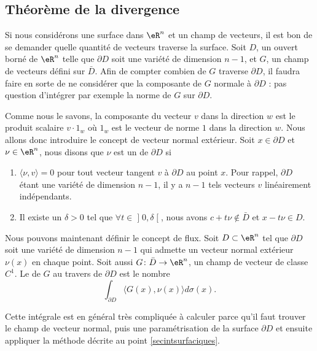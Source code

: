 \subsection{Théorème de la divergence}

Si nous considérons une surface dans $\eR^n$ et un champ de vecteurs, il est bon de se demander quelle \og quantité de vecteurs\fg{} traverse la surface. Soit $D$, un ouvert borné de $\eR^n$ telle que $\partial D$ soit une variété de dimension $n-1$, et $G$, un champ de vecteurs défini sur $\bar D$. Afin de compter combien de $G$ traverse $\partial D$, il faudra faire en sorte de ne considérer que la composante de $G$ normale à $\partial D$ : pas question d'intégrer par exemple la norme de $G$ sur $\partial D$.

Comme nous le savons, la composante du vecteur $v$ dans la direction $w$ est le produit scalaire $v\cdot 1_w$ où $1_w$ est le vecteur de norme $1$ dans la direction $w$. Nous allons donc introduire le concept de vecteur normal extérieur. Soit $x\in\partial D$ et $\nu\in\eR^n$, nous disons que $\nu$ est un  de $\partial D$ si
\begin{enumerate}

	\item
		$\langle \nu, v\rangle =0$ pour tout vecteur tangent $v$ à $\partial D$ au point $x$. Pour rappel, $\partial D$ étant une variété de dimension $n-1$, il y a $n-1$ tels vecteurs $v$ linéairement indépendants.
	
	\item
		Il existe un $\delta>0$ tel que $\forall t\in\mathopen] 0 , \delta \mathclose[$, nous avons $c+t\nu\notin \bar D$ et $x-t\nu\in D$.
 
\end{enumerate}

Nous pouvons maintenant définir le concept de flux. Soit $D\subset \eR^n$ tel que $\partial D$ soit une variété de dimension $n-1$ qui admette un vecteur normal extérieur $\nu(x)$ en chaque point. Soit aussi $G\colon \bar D\to \eR^n$, un champ de vecteur de classe $C^1$. Le  de $G$ au travers de $\partial D$ est le nombre
\begin{equation}
	\int_{\partial D}\langle G(x), \nu(x)\rangle d\sigma(x).
\end{equation}

Cette intégrale est en général très compliquée à calculer parce qu'il faut trouver le champ de vecteur normal, puis une paramétrisation de la surface $\partial D$ et ensuite appliquer la méthode décrite au point \ref{secintsurfaciques}. 

